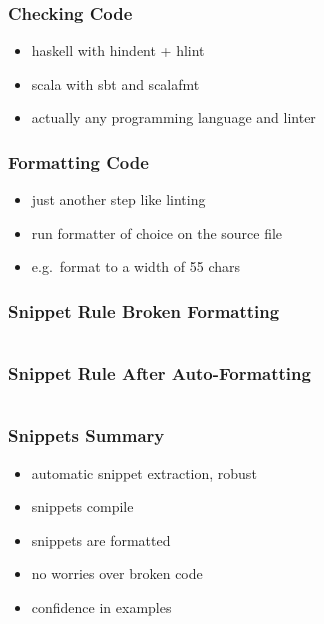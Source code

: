 \documentclass{beamer}
\begin{document}
\begin{frame}
  \frametitle{Checking Code}
  \begin{itemize}
  \item haskell with hindent + hlint
  \item scala with sbt and scalafmt
  \item actually any programming language and linter
  \end{itemize}
\end{frame}

\begin{frame}
  \frametitle{Formatting Code}
  \begin{itemize}
  \item just another step like linting
  \item run formatter of choice on the source file
  \item e.g.\ format to a width of 55 chars
  \end{itemize}
\end{frame}

\begin{frame}
  \frametitle{Snippet Rule \textemdash{} Broken Formatting}
  \begin{center}
    \inputminted[autogobble, highlightlines={3}]{haskell}{snippets/outer-haskell-snippet-rule.hs_noformat}
  \end{center}
\end{frame}

\begin{frame}
  \frametitle{Snippet Rule \textemdash{} After Auto-Formatting}
  \begin{center}
    \inputminted[autogobble, highlightlines={2-4}]{haskell}{snippets/haskell-snippet-rule.hs}
  \end{center}
\end{frame}

\begin{frame}
  \frametitle{Snippets \textemdash{} Summary}
  \begin{itemize}
  \item automatic snippet extraction, robust
  \item snippets compile
  \item snippets are formatted
  \item no worries over broken code
  \item confidence in examples
  \end{itemize}
\end{frame}
\end{document}
